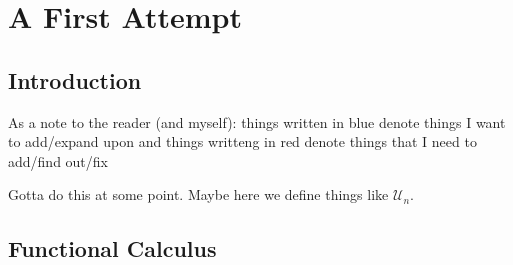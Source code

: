 \chapter{A First Attempt}\label{ch:FirstAttempt}


\section{Introduction}%
\label{sec:Intro}

As a note to the reader (and myself): things written in {\color{blue} blue}
denote things I want to add/expand upon and things writteng in {\color{red} red}
denote things that I need to add/find out/fix

{\color{blue} Gotta do this at some point. Maybe here we define things like \(\mathcal{U}_n\).}

\section{Functional Calculus}%
\label{sec:functionalcalc}

